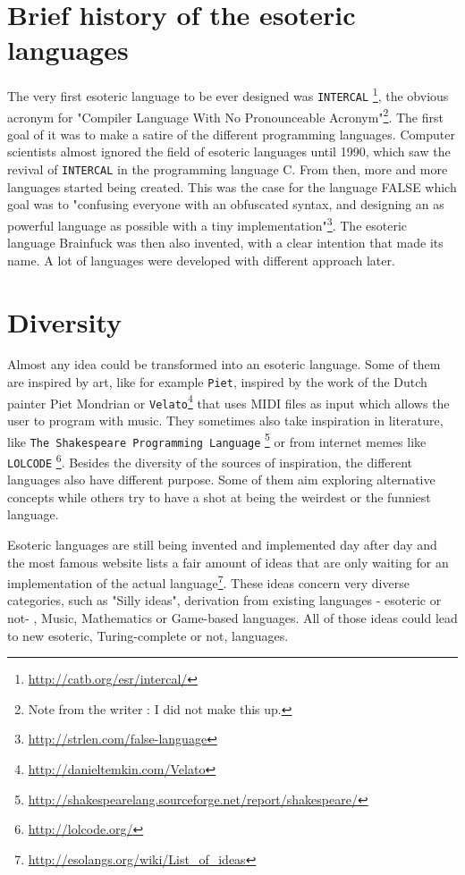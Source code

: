 \documentclass[4paper]{article}
\begin{document}
\section{Brief history of the esoteric languages}
The very first esoteric language to be ever designed was \texttt{INTERCAL} \footnote{\url{http://catb.org/esr/intercal/}}, the obvious acronym for "Compiler Language With No Pronounceable Acronym"\footnote{Note from the writer : I did not make this up.}. The first goal of it was to make a satire of the different programming languages. Computer scientists almost ignored the field of esoteric languages until 1990, which saw the revival of \texttt{INTERCAL} in the programming language C. From then, more and more languages started being created. This was the case for the language FALSE which goal was to "confusing everyone with an obfuscated syntax, and designing an as powerful language as possible with a tiny implementation"\footnote{\url{http://strlen.com/false-language}}. The esoteric language Brainfuck was then also invented, with a clear intention that made its name. A lot of languages were developed with different approach later. 

\section{Diversity}
Almost any idea could be transformed into an esoteric language. Some of them are inspired by art, like for example \texttt{Piet}, inspired by the work of the Dutch painter Piet Mondrian or \texttt{Velato}\footnote{\url{http://danieltemkin.com/Velato}} that uses MIDI files as input which allows the user to program with music. They sometimes also take inspiration in literature, like \texttt{The Shakespeare Programming Language} \footnote{\url{http://shakespearelang.sourceforge.net/report/shakespeare/}} or from internet memes like \texttt{LOLCODE} \footnote{\url{http://lolcode.org/}}. Besides the diversity of the sources of inspiration, the different languages also have different purpose. Some of them aim exploring alternative concepts while others try to have a shot at being the weirdest or the funniest language.

Esoteric languages are still being invented and implemented day after day and the most famous website lists a fair amount of ideas that are only waiting for an implementation of the actual language\footnote{\url{http://esolangs.org/wiki/List_of_ideas}}. These ideas concern very diverse categories, such as "Silly ideas", derivation from existing languages - esoteric or not- , Music, Mathematics or Game-based languages. All of those ideas could lead to new esoteric, Turing-complete or not, languages.
\end{document}
